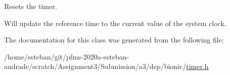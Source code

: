 Resets the timer. 

Will update the reference time to the current value of the system clock. 

The documentation for this class was generated from the following file\+:\begin{DoxyCompactItemize}
\item 
/home/esteban/git/pfms-\/2020a-\/esteban-\/andrade/scratch/\+Assignment3/\+Submission/a3/dep/bionic/\hyperlink{bionic_2timer_8h}{timer.\+h}\end{DoxyCompactItemize}
